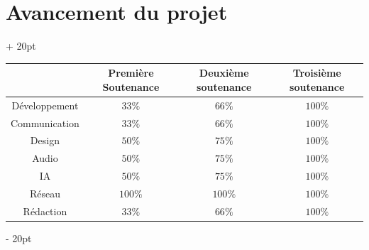 \documentclass[a4paper, 12pt, twoside]{article}
\newcommand{\ind}[1][20pt]{\advance\leftskip + #1}
\newcommand{\deind}[1][20pt]{\advance\leftskip - #1}
\newenvironment{indt}[2][20pt]{#2 \par \ind[#1]}{\par \deind} %
\begin{document}
    \begin{indt}{\section{Avancement du projet}}
        \begin{center}
            \begin{tabular}{|c|c|c|c|}
                \hline
                & Première Soutenance & Deuxième soutenance & Troisième soutenance
                \\
                \hline
                Développement & $33\%$ & $66\%$ & $100\%$
                \\
                \hline
                Communication & $33\%$ & $66\%$ & $100\%$
                \\
                \hline
                Design & $50\%$ & $75\%$ & $100\%$
                \\
                \hline
                Audio & $50\%$ & $75\%$ & $100\%$
                \\
                \hline
                IA & $50\%$ & $75\%$ & $100\%$
                \\
                \hline
                Réseau & $100\%$ & $100\%$ & $100\%$
                \\
                \hline
                Rédaction & $33\%$ & $66\%$ & $100\%$
                \\
                \hline
            \end{tabular}
        \end{center}
    \end{indt}
\end{document}
